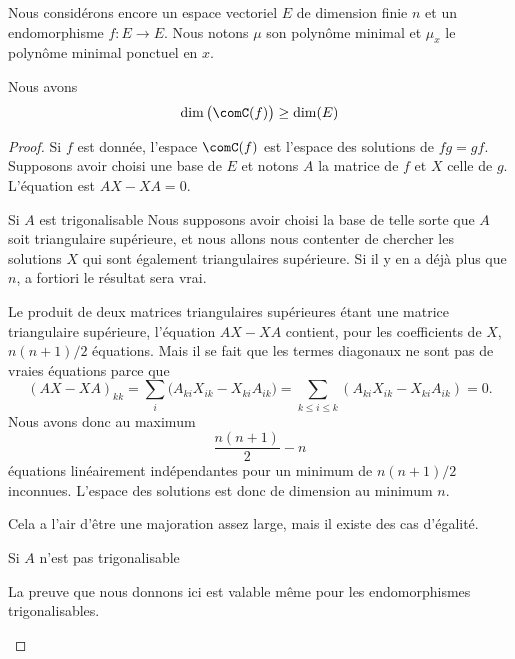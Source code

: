 Nous considérons encore un espace vectoriel \( E\) de dimension finie \( n\) et un endomorphisme \( f\colon E\to E\). Nous notons \( \mu\) son polynôme minimal et \( \mu_x\) le polynôme minimal ponctuel en \( x\).

\begin{lemma}       \label{LEMooDFFDooJTQkRu}
	Nous avons
	\begin{equation}
		\dim\big( \comC(f) \big)\geq \dim(E)
	\end{equation}
\end{lemma}

\begin{proof}
	Si \( f\) est donnée, l'espace \( \comC(f)\) est l'espace des solutions de \( fg=gf\). Supposons avoir choisi une base de \( E\) et notons \( A\) la matrice de \( f\) et \( X\) celle de \( g\). L'équation est \( AX-XA=0\).
	\begin{subproof}
		\item[Si \( A\) est trigonalisable]
		Nous supposons avoir choisi la base de telle sorte que \( A\) soit triangulaire supérieure, et nous allons nous contenter de chercher les solutions \( X\) qui sont également triangulaires supérieure. Si il y en a déjà plus que \( n\), a fortiori le résultat sera vrai.

		Le produit de deux matrices triangulaires supérieures étant une matrice triangulaire supérieure, l'équation \( AX-XA\) contient, pour les coefficients de \( X\), \( n(n+1)/2\) équations. Mais il se fait que les termes diagonaux ne sont pas de vraies équations parce que
		\begin{equation}
			(AX-XA)_{kk}=\sum_i\big( A_{ki}X_{ik}-X_{ki}A_{ik} \big)=\sum_{k\leq i\leq k}(A_{ki}X_{ik}-X_{ki}A_{ik})=0.
		\end{equation}
		Nous avons donc au maximum
		\begin{equation}
			\frac{ n(n+1) }{2}-n
		\end{equation}
		équations linéairement indépendantes pour un minimum de \( n(n+1)/2\) inconnues. L'espace des solutions est donc de dimension au minimum \( n\).

		Cela a l'air d'être une majoration assez large, mais il existe des cas d'égalité.

		\item[Si \( A\) n'est pas trigonalisable]

		La preuve que nous donnons ici est valable même pour les endomorphismes trigonalisables.


\end{subproof}
\end{proof}

